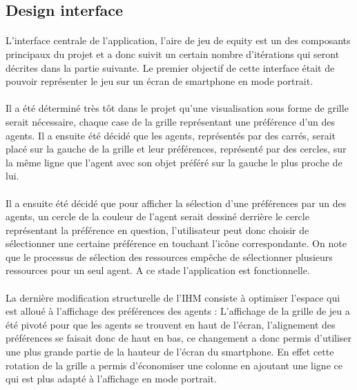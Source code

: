 \documentclass[a4paper, 10pt]{article}
\begin{document}
	\subsection{Design interface}
	
\paragraph{}
L’interface centrale de  l’application, l’aire de jeu de equity est un des composants principaux du projet et a donc suivit un certain nombre d'itérations qui seront décrites dans la partie suivante. Le premier objectif de cette interface était de pouvoir représenter le jeu sur un écran de smartphone en mode portrait.
\paragraph{}
Il a été déterminé très tôt dans le projet qu’une visualisation sous forme de grille serait nécessaire, chaque case de la grille représentant une préférence d’un des agents. Il a ensuite été décidé que les agents, représentés par des carrés, serait placé sur la gauche de la grille et leur préférences, représenté par des cercles, sur la même ligne que l’agent avec son objet préféré sur la gauche le plus proche de lui.
\paragraph{}
Il a ensuite été décidé que pour afficher la sélection d’une préférences par un des agents, un cercle de la couleur de l’agent serait dessiné derrière le cercle représentant la préférence en question, l'utilisateur peut donc choisir de sélectionner une certaine préférence en touchant l'icône correspondante. On note que le processus de sélection des ressources empêche de sélectionner plusieurs ressources pour un seul agent. A ce stade l’application est fonctionnelle.
\paragraph{}
La dernière modification structurelle de l’IHM consiste à optimiser l’espace qui est alloué à l’affichage des préférences des agents : L'affichage de la grille de jeu a été pivoté pour que les agents se trouvent en haut de l'écran, l'alignement des préférences se faisait donc de haut en bas, ce changement a donc permis d'utiliser une plus grande partie de la hauteur de l'écran du smartphone. En effet cette rotation de la grille a permis d'économiser une colonne en ajoutant une ligne ce qui est plus adapté à l’affichage en mode portrait.
\end{document}
